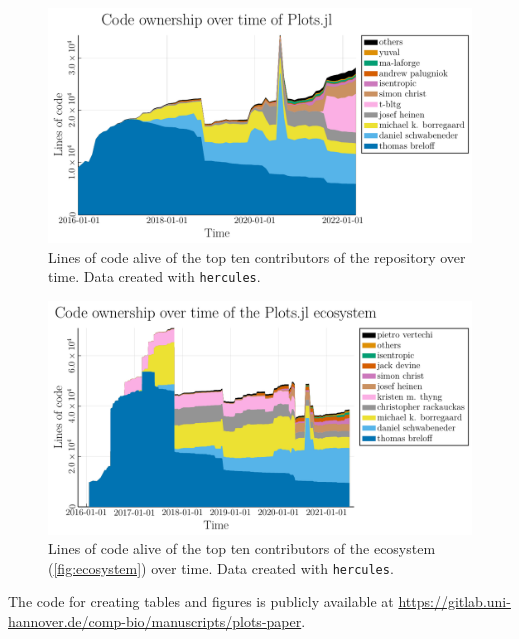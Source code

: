 \documentclass[a4paper]{article}
\begin{document}
\begin{figure}[H]
    \centering
    \includegraphics[width=\textwidth]{./fig/Burndown_people_Plots1.13.2}
    \caption{
        Lines of code alive of the top ten contributors of the \Plots repository over time.
        Data created with \texttt{hercules}\cite{SrcdHercules2021}.
        }
    \label{fig:burndown_people}
\end{figure}

\begin{figure}[H]
    \centering
    \includegraphics[width=\textwidth]{./fig/Burndown_people_Plots_Ecosystem1.13.2}
    \caption{
        Lines of code alive of the top ten contributors of the \Plots ecosystem (\cref{fig:ecosystem}) over time.
        Data created with \texttt{hercules}\cite{SrcdHercules2021}.
        }
    \label{fig:burndown_eco}
\end{figure}



The code for creating tables and figures is publicly available at \url{https://gitlab.uni-hannover.de/comp-bio/manuscripts/plots-paper}.
\end{document}
